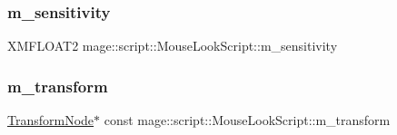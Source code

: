 \hypertarget{classmage_1_1script_1_1_mouse_look_script_a9030a04a664c01dcec63c4e63f885302}{}\label{classmage_1_1script_1_1_mouse_look_script_a9030a04a664c01dcec63c4e63f885302} 
\subsubsection{\texorpdfstring{m\+\_\+sensitivity}{m\_sensitivity}}
{\footnotesize\ttfamily X\+M\+F\+L\+O\+A\+T2 mage\+::script\+::\+Mouse\+Look\+Script\+::m\+\_\+sensitivity\hspace{0.3cm}{\ttfamily [private]}}

\hypertarget{classmage_1_1script_1_1_mouse_look_script_a45183059f39d6ab4a45e7b0485c9b987}{}\label{classmage_1_1script_1_1_mouse_look_script_a45183059f39d6ab4a45e7b0485c9b987} 
\subsubsection{\texorpdfstring{m\+\_\+transform}{m\_transform}}
{\footnotesize\ttfamily \hyperlink{classmage_1_1_transform_node}{Transform\+Node}$\ast$ const mage\+::script\+::\+Mouse\+Look\+Script\+::m\+\_\+transform\hspace{0.3cm}{\ttfamily [private]}}

